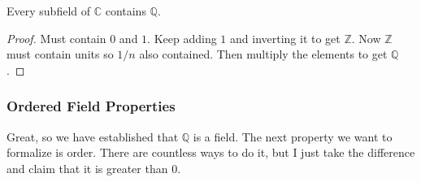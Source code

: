     \begin{lemma}
      Every subfield of $\mathbb{C}$ contains $\mathbb{Q}$. 
    \end{lemma}
    \begin{proof}
      Must contain $0$ and $1$. Keep adding $1$ and inverting it to get $\mathbb{Z}$. Now $\mathbb{Z}$ must contain units so $1/n$ also contained. Then multiply the elements to get $\mathbb{Q}$. 
    \end{proof} 

  \subsubsection{Ordered Field Properties} 

    Great, so we have established that $\mathbb{Q}$ is a field. The next property we want to formalize is order. There are countless ways to do it, but I just take the difference and claim that it is greater than $0$. 

